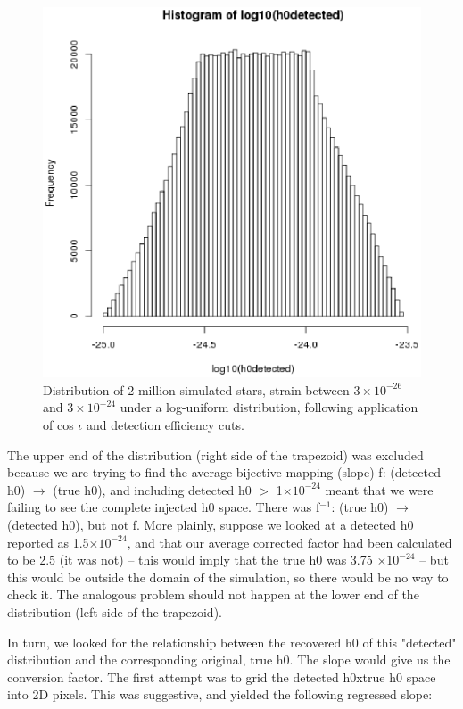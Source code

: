 \begin{figure}
\begin{center}
\includegraphics[width=0.3\paperwidth,height=0.2\paperheight]{PlotHEffDistH0Detected.eps}
\caption{Distribution of 2 million simulated stars, strain between $3\times 10^{-26}$ and $3\times 10^{-24}$ under a log-uniform distribution, following application of cos $\iota$ and detection efficiency cuts.
}
\end{center}
\end{figure}


The upper end of the distribution (right side of the trapezoid) was excluded because we are trying to find the average bijective mapping (slope) f: (detected h0) $\rightarrow$ (true h0), and including detected h0 $>$ 1$\times 10^{-24}$ meant that we were failing to see the complete injected h0 space. There was f$^{-1}$: (true h0) $\rightarrow$ (detected h0), but not f. More plainly, suppose we looked at a detected h0 reported as 1.5$\times 10^{-24}$, and that our average corrected factor had been calculated to be 2.5 (it was not) -- this would imply that the true h0 was 3.75 $\times 10^{-24}$ -- but this would be outside the domain of the simulation, so there would be no way to check it. The analogous problem should not happen at the lower end of the distribution (left side of the trapezoid).

In turn, we looked for the relationship between the recovered h0 of this "detected" distribution and the corresponding original, true h0. The slope would give us the conversion factor. The first attempt was to grid the {detected h0}x{true h0} space into 2D pixels. This was suggestive, and yielded the following regressed slope:

